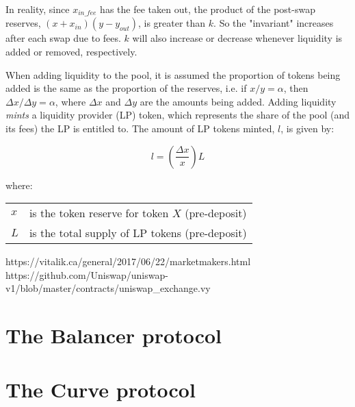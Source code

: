 \documentclass[nohyper]{tufte-handout}
\begin{document}
In reality, since $x_{in\_fee}$ has the fee taken out, the product of the post-swap reserves, $(x + x_{in})(y-y_{out})$, is greater than $k$.  So the "invariant" increases after each swap due to fees.  $k$ will also increase or decrease whenever liquidity is added or removed, respectively.

When adding liquidity to the pool, it is assumed the proportion of tokens being added is the same as the proportion of the reserves, i.e. if $x / y = \alpha$, then $\Delta x / \Delta y = \alpha$, where $\Delta x$ and $\Delta y$ are the amounts being added.  Adding liquidity \emph{mints} a liquidity provider (LP) token, which represents the share of the pool (and its fees) the LP is entitled to.  The amount of LP tokens minted, $l$, is given by:

\begin{equation}
    l = \left(\frac{\Delta x}{x}\right) L
\end{equation}

where:

\begin{tabular}{@{\qquad }ll}
    $x$ & is the token reserve for token $X$ (pre-deposit) \\
    $L$ & is the total supply of LP tokens (pre-deposit)\\
\end{tabular}


https://vitalik.ca/general/2017/06/22/marketmakers.html
https://github.com/Uniswap/uniswap-v1/blob/master/contracts/uniswap\_exchange.vy

\section{The Balancer protocol}\label{balancer}

\section{The Curve protocol}\label{curve}



\end{document}
